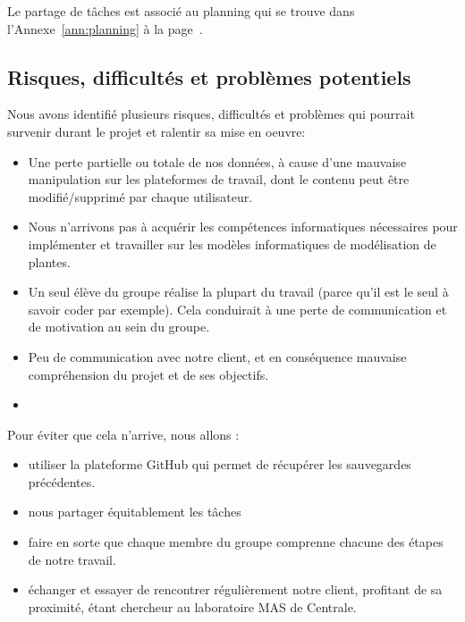 Le partage de tâches est associé au planning qui se trouve
dans l'Annexe~\ref{ann:planning} à la page~\pageref{ann:planning}.

\subsection{Risques, difficultés et problèmes potentiels}
Nous avons identifié plusieurs risques, difficultés et problèmes qui pourrait survenir durant le projet et ralentir sa mise en oeuvre: 

\begin{itemize}
	\item Une perte partielle ou totale de nos données, à cause d'une mauvaise manipulation sur les plateformes de travail, dont le contenu peut être modifié/supprimé par chaque utilisateur.
	\item Nous n'arrivons pas à acquérir les compétences informatiques nécessaires pour implémenter et travailler sur les modèles informatiques de modélisation de plantes.
	\item Un seul élève du groupe réalise la plupart du travail (parce qu'il est le seul à savoir coder par exemple). Cela conduirait à une perte de communication et de motivation au sein du groupe.
	\item Peu de communication avec notre client, et en conséquence mauvaise compréhension du projet et de ses objectifs.
	\item 
\end{itemize}

Pour éviter que cela n'arrive, nous allons :
\begin{itemize}
	\item utiliser la plateforme GitHub qui permet de récupérer les sauvegardes précédentes.
	\item nous partager équitablement les tâches
	\item faire en sorte que chaque membre du groupe comprenne chacune des étapes de notre travail.
	\item échanger et essayer de rencontrer régulièrement notre client, profitant de sa proximité, étant chercheur au laboratoire MAS de Centrale.
\end{itemize}
